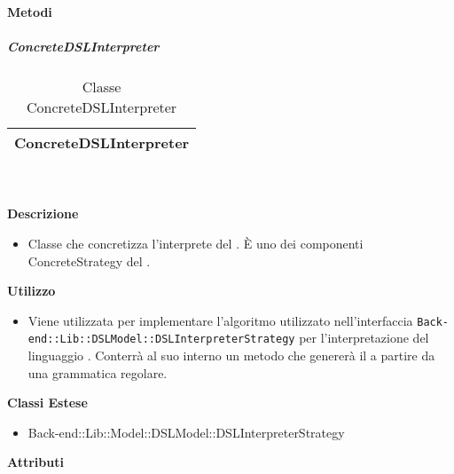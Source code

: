 		\textbf{Metodi} 
	\begin{itemize}
		\end{itemize}
			\subparagraph{ConcreteDSLInterpreter} 
\begin{table}[ht]
\begin{center}
\bgroup
	\setlength{\arrayrulewidth}{0.6mm}
	\def\arraystretch{1}
		\begin{tabular}{ | p{12cm} | }
				\hline  
					\centerline{\textbf{ConcreteDSLInterpreter}}
		\\ \hline 
				\hline
				\hline
		
		\end{tabular}
\egroup
\caption{Classe ConcreteDSLInterpreter}
\end{center}
\end{table}  \textbf{\\ \\ Descrizione} 
					\begin{itemize}
						\item[] Classe che concretizza l'interprete del . È uno dei componenti ConcreteStrategy del  .
					\end{itemize}      
				\textbf{Utilizzo}  
					\begin{itemize}
						\item[] Viene utilizzata per implementare l'algoritmo utilizzato nell'interfaccia \texttt{Back-end::Lib::DSLModel::DSLInterpreterStrategy} per l'interpretazione del linguaggio . Conterrà al suo interno un metodo che genererà il  a partire da una grammatica regolare.
					\end{itemize}
					\textbf{Classi Estese}
					\begin{itemize}
								\item{Back-end::Lib::Model::DSLModel::DSLInterpreterStrategy}
					\end{itemize}
			 \textbf{Attributi} 
	\begin{itemize}
		\end{itemize}
		
